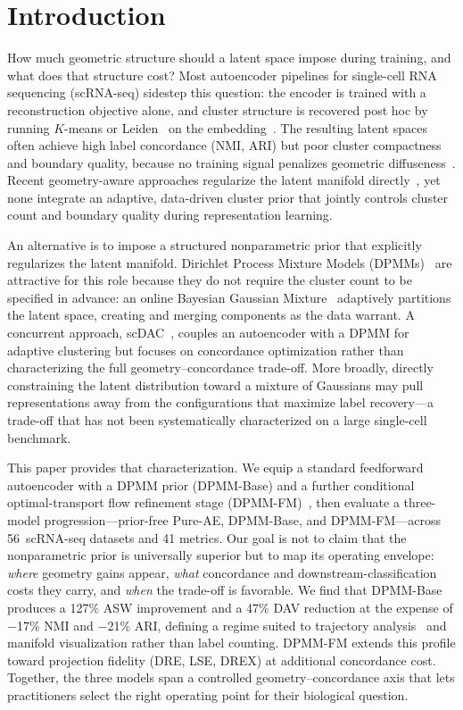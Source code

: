\documentclass[biology,article,submit,pdftex,moreauthors]{Definitions/mdpi}
\begin{document}
\section{Introduction}\label{sec:intro}

How much geometric structure should a latent space impose during training, and what does that structure cost? Most autoencoder pipelines for single-cell RNA sequencing (scRNA-seq) sidestep this question: the encoder is trained with a reconstruction objective alone, and cluster structure is recovered post hoc by running $K$-means or Leiden~\cite{traag2019leiden} on the embedding~\cite{lopez2018deep,gronbech2020scvae}. The resulting latent spaces often achieve high label concordance (NMI, ARI) but poor cluster compactness and boundary quality, because no training signal penalizes geometric diffuseness~\cite{zheng2017massively,hwang2018single}. Recent geometry-aware approaches regularize the latent manifold directly~\cite{duque2022grae}, yet none integrate an adaptive, data-driven cluster prior that jointly controls cluster count and boundary quality during representation learning.

An alternative is to impose a structured nonparametric prior that explicitly regularizes the latent manifold. Dirichlet Process Mixture Models (DPMMs)~\cite{ferguson1973bayesian,neal2000markov} are attractive for this role because they do not require the cluster count to be specified in advance: an online Bayesian Gaussian Mixture~\cite{blei2006variational} adaptively partitions the latent space, creating and merging components as the data warrant. A concurrent approach, scDAC~\cite{an2024scdac}, couples an autoencoder with a DPMM for adaptive clustering but focuses on concordance optimization rather than characterizing the full geometry--concordance trade-off. More broadly, directly constraining the latent distribution toward a mixture of Gaussians may pull representations away from the configurations that maximize label recovery---a trade-off that has not been systematically characterized on a large single-cell benchmark.

This paper provides that characterization. We equip a standard feedforward autoencoder with a DPMM prior (DPMM-Base) and a further conditional optimal-transport flow refinement stage (DPMM-FM)~\cite{lipman2023flow,tong2024improving}, then evaluate a three-model progression---prior-free Pure-AE, DPMM-Base, and DPMM-FM---across 56~scRNA-seq datasets and 41 metrics. Our goal is not to claim that the nonparametric prior is universally superior but to map its operating envelope: \emph{where} geometry gains appear, \emph{what} concordance and downstream-classification costs they carry, and \emph{when} the trade-off is favorable. We find that DPMM-Base produces a 127\% ASW improvement and a 47\% DAV reduction at the expense of $-$17\% NMI and $-$21\% ARI, defining a regime suited to trajectory analysis~\cite{saelens2019comparison} and manifold visualization rather than label counting. DPMM-FM extends this profile toward projection fidelity (DRE, LSE, DREX) at additional concordance cost. Together, the three models span a controlled geometry--concordance axis that lets practitioners select the right operating point for their biological question.
\end{document}
